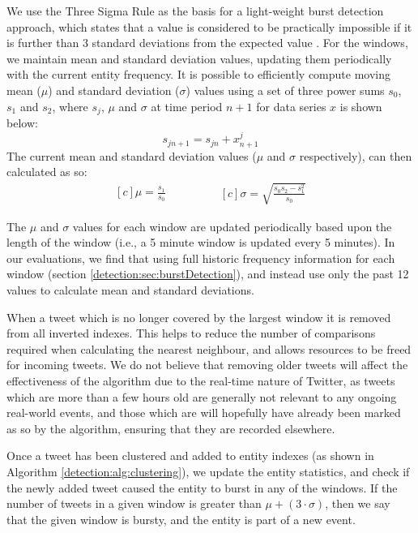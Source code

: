 We use the Three Sigma Rule as the basis for a light-weight burst detection approach, which states that a value is considered to be practically impossible if it is further than 3 standard deviations from the expected value \citep{Pukelsheim94}. For the windows, we maintain mean and standard deviation values, updating them periodically with the current entity frequency. It is possible to efficiently compute moving mean (\(\mu\)) and standard deviation (\(\sigma\)) values using a set of three power sums \(s_0\), \(s_1\) and \(s_2\), where \(s_j\), \(\mu\) and \(\sigma\) at time period \(n+1\) for data series \(x\) is shown below:
\[
s_{jn+1}= s_{jn} + x_{n+1}^j
\]
The current mean and standard deviation values (\(\mu\) and \(\sigma\) respectively), can then calculated as so:
\begin{equation*}
	\begin{aligned}[c]
		\mu = \frac{s_1}{s_0}
	\end{aligned}
	\qquad\qquad
	\begin{aligned}[c]
		\sigma = \sqrt{\frac{s_0 s_2 - s_1^2}{s_0}}
	\end{aligned}
\end{equation*}

The \(\mu\) and \(\sigma\) values for each window are updated periodically based upon the length of the window (i.e., a 5 minute window is updated every 5 minutes).
In our evaluations, we find that using full historic frequency information for each window (section \ref{detection:sec:burstDetection}), and instead use only the past 12 values to calculate mean and standard deviations.

When a tweet which is no longer covered by the largest window it is removed from all inverted indexes. This helps to reduce the number of comparisons required when calculating the nearest neighbour, and allows resources to be freed for incoming tweets. We do not believe that removing older tweets will affect the effectiveness of the algorithm due to the real-time nature of Twitter, as tweets which are more than a few hours old are generally not relevant to any ongoing real-world events, and those which are will hopefully have already been marked as so by the algorithm, ensuring that they are recorded elsewhere.

Once a tweet has been clustered and added to entity indexes (as shown in Algorithm \ref{detection:alg:clustering}), we update the entity statistics, and check if the newly added tweet caused the entity to burst in any of the windows. If the number of tweets in a given window is greater than \(\mu + (3 \cdot \sigma)\), then we say that the given window is bursty, and the entity is part of a new event.


